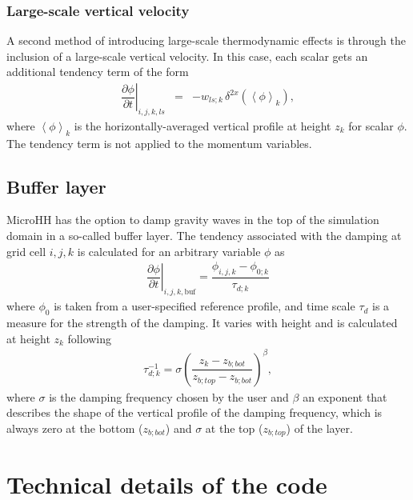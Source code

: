 \documentclass[gmd,manuscript]{copernicus}
\begin{document}
\subsubsection{Large-scale vertical velocity}
A second method of introducing large-scale thermodynamic effects is through the inclusion of a large-scale vertical velocity. In this case, each scalar gets an additional tendency term of the form
\begin{eqnarray}
\left. \dfrac{\partial \phi}{\partial t}\right|_{i,j,k,ls} & = &  - w_{ls;k}\,\delta^{2x} \left( \left< \phi \right>_k \right),
\end{eqnarray}
where $\left< \phi \right>_k$ is the horizontally-averaged vertical profile at height $z_k$ for scalar $\phi$. The tendency term is not applied to the momentum variables.

\subsection{Buffer layer}
MicroHH has the option to damp gravity waves in the top of the simulation domain in a so-called buffer layer.  The tendency associated with the damping at grid cell $i,j,k$ is calculated for an arbitrary variable $\phi$ as
\begin{eqnarray}
\left. \dfrac{\partial \phi}{\partial t}\right|_{i,j,k,\textrm{buf}} = \dfrac{\phi_{i,j,k} - \phi_{0;k}}{\tau_{d;k}}
\end{eqnarray}
where $\phi_0$ is taken from a user-specified reference profile, and time scale $\tau_d$ is a measure for the strength of the damping. It varies with height and is calculated at height $z_k$ following
\begin{eqnarray}
\tau_{d;k}^{-1} = \sigma \left( \dfrac{z_k - z_{b;bot} }{z_{b;top} - z_{b;bot}} \right)^\beta,
\end{eqnarray}
where $\sigma$ is the damping frequency chosen by the user and $\beta$ an exponent that describes the shape of the vertical profile of the damping frequency, which is always zero at the bottom ($z_{b;bot}$) and $\sigma$ at the top ($z_{b;top}$)  of the layer.

\section{Technical details of the code}\label{sec:technical}
\end{document}
